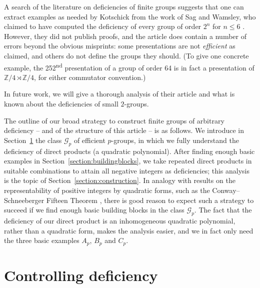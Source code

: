 \documentclass[a4paper,12pt]{amsart}
\theoremstyle{plain}
\theoremstyle{definition}
\newcommand{\Gp}{\mathcal{G}_p}
\newcommand{\Z}{\mathbb{Z}}
\begin{document}
A search of the literature on deficiencies of finite groups suggests that one can extract examples as needed by Kotschick from the work of Sag and Wamsley, who claimed to have computed the deficiency of every group of order $2^n$ for $n \leq 6$ \cite{sagwamsley}.
However, they did not publish proofs, and the article does contain a number of errors beyond the obvious misprints: some presentations are not \emph{efficient} as claimed, and others do not define the groups they should.
(To give one concrete example, the 252\textsuperscript{nd} presentation of a group of order 64 is in fact a presentation of $\Z/4 \rtimes \Z/4$, for either commutator convention.)
\begin{collectors}
In future work, we will give a thorough analysis of their article and what is known about the deficiencies of small $2$-groups.
\end{collectors}

The outline of our broad strategy to construct finite groups of arbitrary deficiency -- and of the structure of this article -- is as follows.
We introduce in Section~\ref{section:control} the class $\Gp$ of efficient $p$-groups, in which we fully understand the deficiency of direct products (a quadratic polynomial).
After finding enough basic examples in Section~\ref{section:buildingblocks}, we take repeated direct products in suitable combinations to attain all negative integers as deficiencies; this analysis is the topic of Section~\ref{section:construction}.
In analogy with results on the representability of positive integers by quadratic forms, such as the Conway--Schneeberger Fifteen Theorem \cite{bhargava}, there is good reason to expect such a strategy to succeed if we find enough basic building blocks in the class $\Gp$.
The fact that the deficiency of our direct product is an inhomogeneous quadratic polynomial, rather than a quadratic form, makes the analysis easier, and we in fact only need the three basic examples $A_p$, $B_p$ and $C_p$.

\section{Controlling deficiency}
\label{section:control}
\end{document}
